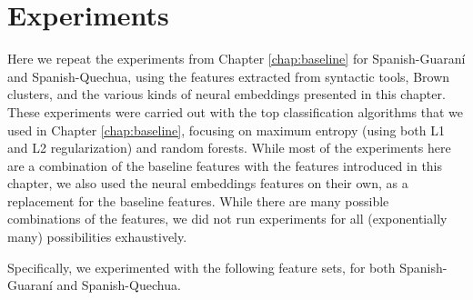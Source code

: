 \section{Experiments}
\label{sec:monolingual-experiments}
Here we repeat the experiments from Chapter \ref{chap:baseline} for
Spanish-Guaraní and Spanish-Quechua, using the features extracted from
syntactic tools, Brown clusters, and the various kinds of neural embeddings
presented in this chapter.
These experiments were carried out with the top classification algorithms that
we used in Chapter \ref{chap:baseline}, focusing on maximum entropy (using both
L1 and L2 regularization) and random forests. While most of the experiments
here are a combination of the baseline features with the features introduced in
this chapter, we also used the neural embeddings features on their own,
as a replacement for the baseline features. While there are many possible
combinations of the features, we did not run experiments for all (exponentially
many) possibilities exhaustively.

Specifically, we experimented with the following feature sets, for both
Spanish-Guaraní and Spanish-Quechua.

